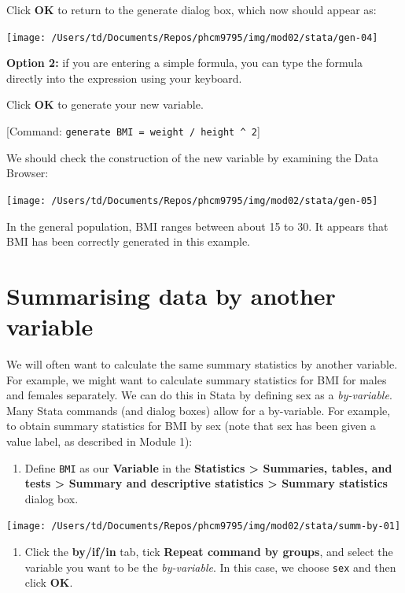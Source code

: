 \documentclass[
]{memoir}
\providecommand{\tightlist}{%
  \setlength{\itemsep}{0pt}\setlength{\parskip}{0pt}}
\begin{document}
Click \textbf{OK} to return to the generate dialog box, which now should appear as:

\texttt{[image: /Users/td/Documents/Repos/phcm9795/img/mod02/stata/gen-04]}

\textbf{Option 2:} if you are entering a simple formula, you can type the formula directly into the expression using your keyboard.

Click \textbf{OK} to generate your new variable.

{[}Command: \texttt{generate\ BMI\ =\ weight\ /\ height\ \^{}\ 2}{]}

We should check the construction of the new variable by examining the Data Browser:

\texttt{[image: /Users/td/Documents/Repos/phcm9795/img/mod02/stata/gen-05]}

In the general population, BMI ranges between about 15 to 30. It appears that BMI has been correctly generated in this example.

\hypertarget{summarising-data-by-another-variable}{%
\section{Summarising data by another variable}\label{summarising-data-by-another-variable}}

We will often want to calculate the same summary statistics by another variable. For example, we might want to calculate summary statistics for BMI for males and females separately. We can do this in Stata by defining sex as a \emph{by-variable}.
Many Stata commands (and dialog boxes) allow for a by-variable. For example, to obtain summary statistics for BMI by sex (note that sex has been given a value label, as described in Module 1):

\begin{enumerate}
\def\labelenumi{\arabic{enumi})}
\tightlist
\item
  Define \texttt{BMI} as our \textbf{Variable} in the \textbf{Statistics \textgreater{} Summaries, tables, and tests \textgreater{} Summary and descriptive statistics \textgreater{} Summary statistics} dialog box.
\end{enumerate}

\texttt{[image: /Users/td/Documents/Repos/phcm9795/img/mod02/stata/summ-by-01]}

\begin{enumerate}
\def\labelenumi{\arabic{enumi})}
\setcounter{enumi}{1}
\tightlist
\item
  Click the \textbf{by/if/in} tab, tick \textbf{Repeat command by groups}, and select the variable you want to be the \emph{by-variable}. In this case, we choose \texttt{sex} and then click \textbf{OK}.
\end{enumerate}
\end{document}
